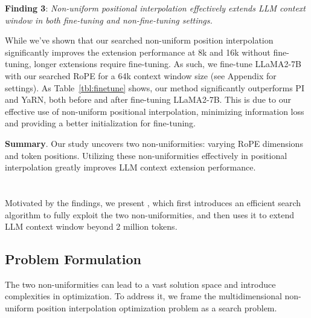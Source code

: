 \documentclass{article}
\theoremstyle{plain}
\theoremstyle{definition}
\theoremstyle{remark}
\begin{document}
\noindent\textbf{Finding 3}: \textit{Non-uniform positional interpolation effectively extends LLM context window in both fine-tuning and non-fine-tuning settings.} 

While we've shown that our searched non-uniform position interpolation significantly improves the extension performance at 8k and 16k without fine-tuning, longer extensions require fine-tuning. As such, we fine-tune LLaMA2-7B with our searched RoPE for a 64k context window size (see Appendix for settings). As Table~\ref{tbl:finetune} shows, our method significantly outperforms PI and YaRN, both before and after fine-tuning LLaMA2-7B. This is due to our effective use of non-uniform positional interpolation, minimizing information loss and providing a better initialization for fine-tuning.





\noindent\textbf{Summary}. Our study uncovers two non-uniformities: varying RoPE dimensions and token positions. Utilizing these non-uniformities effectively in positional interpolation greatly improves LLM context extension performance.

\vspace{-2ex}
\section{{\sysname}}
\vspace{-1ex}
\label{sec:method}
Motivated by the findings, we present {\sysname}, which first introduces an efficient search algorithm to fully exploit the two non-uniformities, and then uses it to extend LLM context window beyond 2 million tokens. 


\vspace{-1ex}
\subsection{Problem Formulation}
\vspace{-1ex}
The two non-uniformities can lead to a vast solution space and introduce complexities in optimization. To address it,  we frame the multidimensional non-uniform position interpolation optimization problem as a  search problem.
\end{document}
